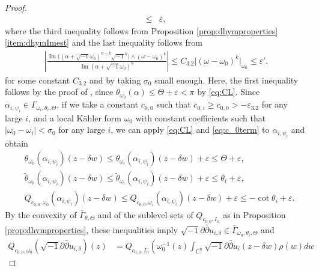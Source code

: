 \documentclass{amsart}
\numberwithin{equation}{section}
\theoremstyle{plain}
\theoremstyle{definition}
\theoremstyle{remark}
\newcommand{\delb}{\sqrt{-1}\partial\bar{\partial}}
\begin{document}
\begin{proof}
\begin{equation}
\begin{aligned}
        \le&\varepsilon,
    \end{aligned}
    \end{equation}
    where the third inequality follows from Proposition \ref{prop:dhymproperties} \ref{item:dhymImest} and the last inequality follows from
    \begin{align*}
        \left\vert\frac{\operatorname{Im}\big((\alpha+\sqrt{-1}\omega_0)^{n-k}\sqrt{-1}^k\big)\wedge(\omega-\omega_0)^k}{\operatorname{Im}(\alpha+\sqrt{-1}\omega_0)^n}\right\vert\le C_{3.2}\vert(\omega-\omega_0)^k\vert_{\omega_0}\le\varepsilon'.
    \end{align*}
    for some constant $C_{3.2}$ and by taking $\sigma_0$ small enough. Here, the first inequality follows by the proof of \cite[Lemma 5.6 (1)]{GChen}, since $\theta_{\omega_0}(\alpha)\le\Theta+\varepsilon<\pi$ by \eqref{eq:CL}.
    Since $\alpha_{i,\psi_i}\in\Gamma_{\omega_i,\theta_i,\Theta}$, if we take a constant $c_{0,0}$ such that $c_{0,i}\ge c_{0,0}>-\varepsilon_{3.2}$ for any large $i$, and a local Kähler form $\omega_0$ with constant coefficients such that $\vert\omega_0-\omega_i\vert<\sigma_0$ for any large $i$, we can apply \eqref{eq:CL} and \eqref{eq:c_0term} to $\alpha_{i,\psi_i}$ and obtain 
    \begin{equation}\label{eq:deltamono}
        \begin{aligned}
            &{\theta}_{\omega_0}(\alpha_{i,\psi_i})(z-\delta w)\le {\theta}_{\omega_i}(\alpha_{i,\psi_i})(z-\delta w)+\varepsilon\le\Theta+\varepsilon,\\
            &\tilde{\theta}_{\omega_0}(\alpha_{i,\psi_i})(z-\delta w)\le \tilde{\theta}_{\omega_i}(\alpha_{i,\psi_i})(z-\delta w)+\varepsilon\le\theta_i+\varepsilon,\\
            &Q_{c_{0,0},\omega_0}(\alpha_{i,\psi_i})(z-\delta w)\le Q_{c_{0,0},\omega_i}(\alpha_{i,\psi_i})(z-\delta w)+\varepsilon\le-\cot\theta_i+\varepsilon.
        \end{aligned}
    \end{equation}
    By the convexity of $\bar{\Gamma}_{\theta,\Theta}$ and of the sublevel sets of $Q_{c_{0,0},I_n}$ as in Proposition \ref{prop:dhymproperties}, these inequalities imply $\delb u_{i,\delta}\in\bar{\Gamma}_{\omega_0,\theta_i,\Theta}$ and
    \begin{equation*}\label{eq:dhymQconv}
        \begin{split}
        Q_{c_{0,0},\omega_0}(\delb u_{i,\delta})(z)
        &=Q_{c_{0,0},I_n}\left(\omega^{-1}_0(z) \int_{\mathbb{C}^n}\delb u_{i}(z-\delta w)\rho(w)dw

\end{split}
\end{equation*}
\end{proof}
\end{document}

